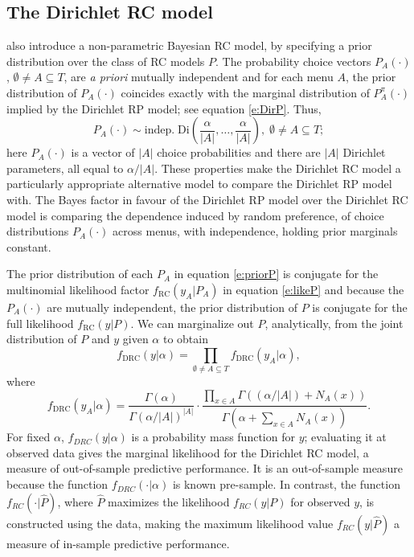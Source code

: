 \documentclass[11pt,letter]{article}
\newcommand{\Dpi}{Dirichlet RP model}
\newcommand{\DP}{Dirichlet RC model}
\begin{document}
\subsection{The \DP{}}\label{s:DP}

 also introduce a non-parametric Bayesian RC model, by specifying a prior distribution over the class of RC models $P$.
The probability choice vectors $P_A(\cdot)$, $\emptyset \neq A \subseteq T$, are {\em a priori} mutually independent and for each menu $A$, the prior distribution of $P_A(\cdot)$ coincides exactly with the marginal distribution of $P^\pi_A(\cdot)$ implied by the \Dpi{}; see equation \eqref{e:DirP}.
Thus,
\begin{equation}\label{e:priorP}
  P_A(\cdot) \sim \mathrm{indep.}\; \mathrm{Di}\left(\frac{\alpha}{|A|},\ldots,\frac{\alpha}{|A|}\right), \; \emptyset \neq A \subseteq T;
\end{equation}
here $P_A(\cdot)$ is a vector of $|A|$ choice probabilities and there are $|A|$ Dirichlet parameters, all equal to $\alpha/|A|$.
These properties make the \DP{} a particularly appropriate alternative model to compare the \Dpi{} with.
The Bayes factor in favour of the \Dpi{} over the \DP{} is comparing the dependence induced by random preference, of choice distributions $P_A(\cdot)$ across menus, with independence, holding prior marginals constant.

The prior distribution of each $P_A$ in equation \eqref{e:priorP} is conjugate for the multinomial likelihood factor $f_\mathrm{RC}(y_A|P_A)$ in equation \eqref{e:likeP} and because the $P_A(\cdot)$ are mutually independent, the prior distribution of $P$ is conjugate for the full likelihood $f_\mathrm{RC}(y|P)$.
We can marginalize out $P$, analytically, from the joint distribution of $P$ and $y$ given $\alpha$ to obtain
\begin{equation}\label{e:RCmlike1}
  f_{\mathrm{DRC}}(y|\alpha) = \prod_{\emptyset \neq A \subseteq T} f_{\mathrm{DRC}}(y_A|\alpha),
\end{equation}
where
\begin{equation}\label{e:RCmlike2}
  f_{\mathrm{DRC}}(y_A|\alpha) = \frac{\Gamma(\alpha)}{\Gamma(\alpha/|A|)^{|A|}} \cdot
  \frac{\prod_{x \in A} \Gamma((\alpha/|A|) + N_A(x))}{\Gamma(\alpha + \sum_{x \in A} N_A(x))}.
\end{equation}
For fixed $\alpha$, $f_{DRC}(y|\alpha)$ is a probability mass function for $y$; evaluating it at observed data gives the marginal likelihood for the \DP{}, a measure of out-of-sample predictive performance.
It is an out-of-sample measure because the function $f_{DRC}(\cdot|\alpha)$ is known pre-sample.
In contrast, the function $f_{RC}(\cdot|\hat{P})$, where $\hat{P}$ maximizes the likelihood $f_{RC}(y|P)$ for observed $y$, is constructed using the data, making the maximum likelihood value $f_{RC}(y|\hat{P})$ a measure of in-sample predictive performance.
\end{document}
